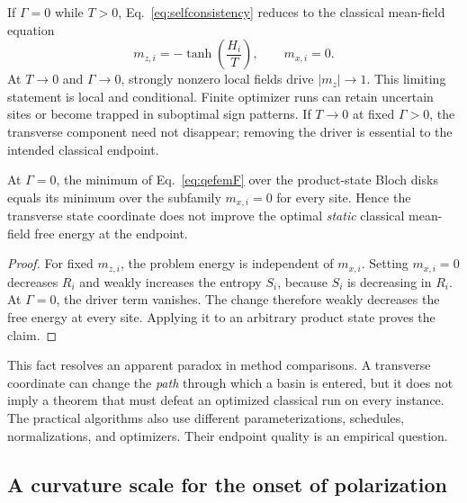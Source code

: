 If $\Gamma=0$ while $T>0$, Eq.~\eqref{eq:selfconsistency} reduces to the
classical mean-field equation
\begin{equation}
 m_{z,i}=-\tanh\!\left(\frac{H_i}{T}\right),
 \qquad m_{x,i}=0.
 \label{eq:classicalmf}
\end{equation}
At $T\to0$ and $\Gamma\to0$, strongly nonzero local fields drive
$|m_z|\to1$. This limiting statement is local and conditional. Finite
optimizer runs can retain uncertain sites or become trapped in suboptimal
sign patterns. If $T\to0$ at fixed $\Gamma>0$, the transverse component
need not disappear; removing the driver is essential to the intended
classical endpoint.

\begin{proposition}
At $\Gamma=0$, the minimum of Eq.~\eqref{eq:qefemF} over the product-state
Bloch disks equals its minimum over the subfamily $m_{x,i}=0$ for every
site. Hence the transverse state coordinate does not improve the optimal
\emph{static} classical mean-field free energy at the endpoint.
\end{proposition}
\begin{proof}
For fixed $m_{z,i}$, the problem energy is independent of $m_{x,i}$.
Setting $m_{x,i}=0$ decreases $R_i$ and weakly increases the entropy
$S_i$, because $S_i$ is decreasing in $R_i$. At $\Gamma=0$, the driver term
vanishes. The change therefore weakly decreases the free energy at every
site. Applying it to an arbitrary product state proves the claim.
\end{proof}

This fact resolves an apparent paradox in method comparisons. A transverse
coordinate can change the \emph{path} through which a basin is entered, but
it does not imply a theorem that \QeFEM{} must defeat an optimized classical
\FEM{} run on every instance. The practical algorithms also use different
parameterizations, schedules, normalizations, and optimizers. Their endpoint
quality is an empirical question.

\subsection{A curvature scale for the onset of polarization}

